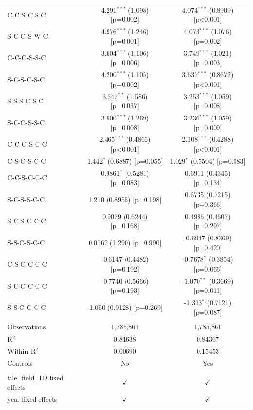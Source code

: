 \begin{table}[H]
\begin{tabular}{lcc}
      C-C-S-C-S-C                     & 4.291$^{***}$ (1.098) [p=0.002]  & 4.074$^{***}$ (0.8909) [p<0.001]\\   
      S-C-C-S-W-C                     & 4.976$^{***}$ (1.246) [p=0.001]  & 4.073$^{***}$ (1.076) [p=0.002]\\   
      C-C-C-S-S-C                     & 3.604$^{***}$ (1.106) [p=0.006]  & 3.749$^{***}$ (1.021) [p=0.003]\\   
      S-C-S-C-S-C                     & 4.200$^{***}$ (1.105) [p=0.002]  & 3.637$^{***}$ (0.8672) [p<0.001]\\   
      S-S-S-C-S-C                     & 3.647$^{**}$ (1.586) [p=0.037]   & 3.253$^{***}$ (1.059) [p=0.008]\\   
      S-C-C-S-S-C                     & 3.900$^{***}$ (1.269) [p=0.008]  & 3.236$^{***}$ (1.059) [p=0.009]\\   
      C-C-C-S-C-C                     & 2.465$^{***}$ (0.4866) [p<0.001] & 2.108$^{***}$ (0.4288) [p<0.001]\\   
      C-S-C-S-C-C                     & 1.442$^{*}$ (0.6887) [p=0.055]   & 1.029$^{*}$ (0.5504) [p=0.083]\\   
      C-C-S-C-C-C                     & 0.9861$^{*}$ (0.5281) [p=0.083]  & 0.6911 (0.4345) [p=0.134]\\   
      S-C-S-S-C-C                     & 1.210 (0.8955) [p=0.198]         & 0.6735 (0.7215) [p=0.366]\\   
      S-C-S-C-C-C                     & 0.9079 (0.6244) [p=0.168]        & 0.4986 (0.4607) [p=0.297]\\   
      S-S-C-S-C-C                     & 0.0162 (1.290) [p=0.990]         & -0.6947 (0.8369) [p=0.420]\\   
      C-S-C-C-C-C                     & -0.6147 (0.4482) [p=0.192]       & -0.7678$^{*}$ (0.3854) [p=0.066]\\   
      S-C-C-C-C-C                     & -0.7740 (0.5666) [p=0.193]       & -1.070$^{**}$ (0.3669) [p=0.011]\\   
      S-S-C-C-C-C                     & -1.050 (0.9128) [p=0.269]        & -1.313$^{*}$ (0.7121) [p=0.087]\\   
       \\
      Observations                    & 1,785,861              & 1,785,861\\  
      R$^2$                           & 0.81638                & 0.84367\\  
      Within R$^2$                    & 0.00690                & 0.15453\\  
      Controls                        & No                     & Yes\\  
       \\
      tile\_field\_ID fixed effects   & $\checkmark$           & $\checkmark$\\   
      year fixed effects              & $\checkmark$           & $\checkmark$\\   
      \bottomrule
   \end{tabular}
\end{table}


